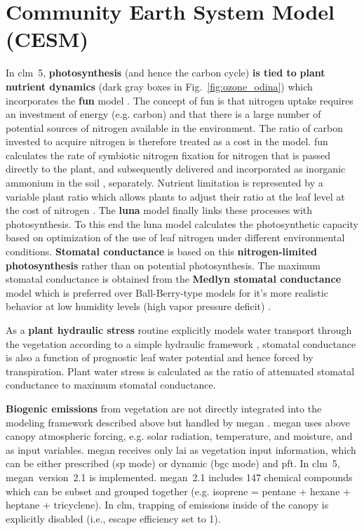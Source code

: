 \section{Community Earth System Model (CESM)}
\label{sec:cesm}
In \gls{clm}~5, \textbf{photosynthesis} (and hence the {\color{darkgray}carbon cycle}) \textbf{is tied to} \textbf{\color{darkgray}plant nutrient dynamics} (dark gray boxes in Fig.~\ref{fig:ozone_odina}) which incorporates the \textbf{\gls{fun}} model \parencites{GBC:Fisher2010}{JGR:Brzostek2014}{GCB:Shi2015}. The concept of \gls{fun} is that nitrogen uptake requires an investment of energy (e.g. carbon) and that there is a large number of potential sources of nitrogen available in the environment. The ratio of carbon invested to acquire nitrogen is therefore treated as a cost in the model. \gls{fun} calculates the rate of symbiotic nitrogen fixation for nitrogen that is passed directly to the plant, and subsequently delivered and incorporated as inorganic ammonium in the soil \parencite{GBC:Cleveland1999}, separately. Nutrient limitation is represented by a variable plant  ratio which allows plants to adjust their  ratio at the leaf level at the cost of nitrogen \parencite{JAMES:Ghimire2016}. The \textbf{\gls{luna}} model \parencites{STE:Xu2019}{GMD:Ali2016} finally links these processes with photosynthesis. To this end the \gls{luna} model calculates the photosynthetic capacity based on optimization of the use of leaf nitrogen under different environmental conditions. \textbf{Stomatal conductance} is based on this \textbf{nitrogen-limited photosynthesis} rather than on potential photosynthesis. The maximum stomatal conductance is obtained from the \textbf{Medlyn stomatal conductance} model \parencite{GCB:Medlyn2011} which is preferred over Ball-Berry-type models \parencite{BallBerry1987} for it’s more realistic behavior at low humidity levels (high vapor pressure deficit) \parencites{PR:Rogers2013}{NP:Rogers2017}.

As a \textbf{plant hydraulic stress} routine explicitly models water transport through the vegetation according to a simple hydraulic framework \parencite{JAMES:Kennedy2019}, stomatal conductance is also a function of prognostic leaf water potential and hence forced by transpiration. Plant water stress is calculated as the ratio of attenuated stomatal conductance to maximum stomatal conductance.

\textbf{Biogenic emissions} from vegetation are not directly integrated into the modeling framework described above but handled by \gls{megan} \parencite{ACP:Guenther2006}. \gls{megan} uses above canopy atmospheric forcing, e.g. solar radiation, temperature, and moisture, and \ch{[CO_2]} as input variables. \gls{megan} receives only \gls{lai} as vegetation input information, which can be either prescribed (\gls{sp} mode) or dynamic (\gls{bgc} mode) and \gls{pft}. In \gls{clm}~5, \gls{megan}~version~2.1 \parencite{GMD:Guenther2012} is implemented. \gls{megan}~2.1 includes 147 chemical compounds which can be subset and grouped together (e.g. isoprene = pentane + hexane + heptane + tricyclene). In \gls{clm}, trapping of emissions inside of the canopy is explicitly disabled (i.e., escape efficiency set to 1).


